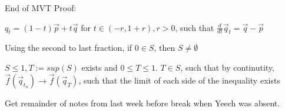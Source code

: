 End of MVT Proof:

$q_t = (1 -t)\vec{p} + t\vec{q}$ for $t \in (-r, 1+r), r > 0$, such that $\frac{d}{dt}\vec{q}_t = \vec{q} - \vec{p}$

Using the second to last fraction, if $0 \in S$, then $S \neq \emptyset$

$S \leq 1, T := sup(S)$ exists and $0 \leq T \leq 1$. $T \in S$, such that by continutity, $\vec{f}(\vec{q}_{t_n}) \to \vec{f}(\vec{q}_T)$, such that the limit of each side of the inequality exists

Get remainder of notes from last week before break when Yeech was absent.
